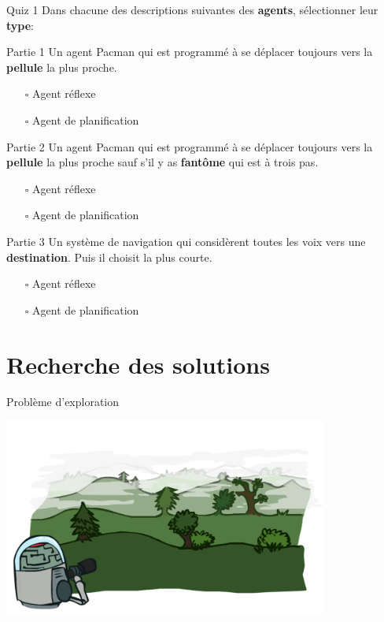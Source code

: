 \documentclass{beamer}
\begin{document}
\begin{frame}[t]{Quiz 1}
  Dans chacune des descriptions suivantes des \textbf{agents}, sélectionner leur
  \textbf{\alert{type}}:
  \begin{block}{Partie 1}
    \scriptsize
    Un agent Pacman qui est programmé à se déplacer toujours vers la
    \textbf{pellule} la plus proche.
    \begin{itemize}
      \tiny
      \item[$\square$] Agent réflexe
      \item[$\square$] Agent de planification 
    \end{itemize}
  \end{block}
  \pause

  \begin{block}{Partie 2}
    \scriptsize
    Un agent Pacman qui est programmé à se déplacer toujours vers la
    \textbf{pellule} la plus proche sauf s'il y as \textbf{fantôme} qui est à
    trois pas.
    \begin{itemize}
      \tiny
      \item[$\square$] Agent réflexe
      \item[$\square$] Agent de planification 
    \end{itemize}
  \end{block}
  \pause
  \begin{block}{Partie 3}
    \scriptsize
    Un système de navigation qui considèrent toutes les voix vers une
    \textbf{destination}. Puis il choisit la plus courte. 
    \begin{itemize}
      \tiny
      \item[$\square$] Agent réflexe
      \item[$\square$] Agent de planification 
    \end{itemize}
  \end{block}
\end{frame}
\section{Recherche des solutions}%
\label{sec:recherche_des_solutions}

\begin{frame}[t]{Problème d'exploration}
  
\centering
\includegraphics[width=0.8\textwidth,
height=0.8\textheight]{./images/search_logo.png}
\end{frame}
\end{document}
